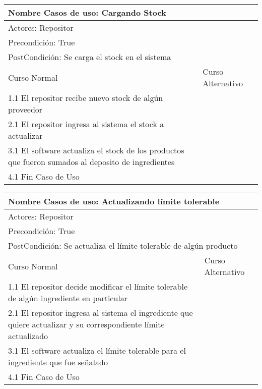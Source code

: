 \documentclass[a4paper,10pt]{article}
\begin{document}
\begin{center}
\begin{tabularx}{14cm}{|X|X|}
\hline
\multicolumn{2}{|l|}{Nombre Casos de uso: Cargando Stock}\\
\hline
\multicolumn{2}{|l|}{Actores: Repositor}\\
\hline
\multicolumn{2}{|l|}{Precondici\'on: True}\\
\hline
\multicolumn{2}{|l|}{PostCondici\'on: Se carga el stock en el sistema}\\
\hline
Curso Normal & Curso Alternativo\\
\hline
1.1 El repositor recibe nuevo stock de alg\'un proveedor & 
\\
\hline
2.1 El repositor ingresa al sistema el stock a actualizar & 
\\
\hline
3.1 El software actualiza el stock de los productos que fueron sumados al deposito de ingredientes &
\\
\hline
4.1 Fin Caso de Uso &
\\
\hline
\end{tabularx}
\end{center}


\bigskip

\begin{center}
\begin{tabularx}{14cm}{|X|X|}
\hline
\multicolumn{2}{|l|}{Nombre Casos de uso: Actualizando l\'imite tolerable}\\
\hline
\multicolumn{2}{|l|}{Actores: Repositor}\\
\hline
\multicolumn{2}{|l|}{Precondici\'on: True}\\
\hline
\multicolumn{2}{|l|}{PostCondici\'on: Se actualiza el l\'imite tolerable de alg\'un producto}\\
\hline
Curso Normal & Curso Alternativo\\
\hline
1.1 El repositor decide modificar el l\'imite tolerable de alg\'un ingrediente en particular & 
\\
\hline
2.1 El repositor ingresa al sistema el ingrediente que quiere actualizar y su correspondiente l\'imite actualizado & 
\\
\hline
3.1 El software actualiza el l\'imite tolerable para el ingrediente que fue se\~{n}alado &
\\
\hline
4.1 Fin Caso de Uso &
\\
\hline
\end{tabularx}
\end{center}
\end{document}
